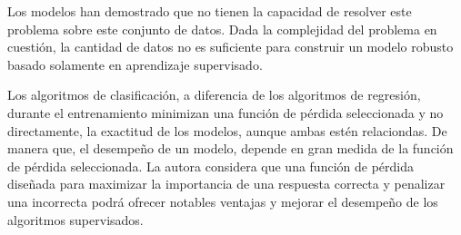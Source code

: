 Los modelos han demostrado que no tienen la capacidad de resolver este problema sobre este conjunto de datos. Dada la complejidad del problema en cuestión, la cantidad de datos no es suficiente para construir un modelo robusto basado solamente en aprendizaje supervisado. 




Los algoritmos de clasificación, a diferencia de los algoritmos de regresión, durante el entrenamiento minimizan una función de pérdida seleccionada y no directamente, la exactitud de los modelos, aunque ambas estén relaciondas. De manera que, el desempeño de un modelo, depende en gran medida de la función de pérdida seleccionada. La autora considera que una función de pérdida diseñada para maximizar la importancia de una respuesta correcta y penalizar una incorrecta podrá ofrecer notables ventajas y mejorar el desempeño de los algoritmos supervisados. 



